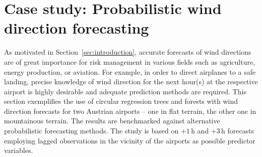 \documentclass[nojss,shortnames]{jss}
\numberwithin{equation}{section}
\begin{document}
\section{Case study: Probabilistic wind direction forecasting}
\label{sec:wind}
As motivated in Section~\ref{sec:introduction}, accurate forecasts of wind
directions are of great importance for risk management in various fields such
as agriculture, energy production, or aviation. For example, in order to direct
airplanes to a safe landing, precise knowledge of wind direction for the next
hour(s) at the respective airport is highly desirable and adequate prediction
methods are required. This section exemplifies the use of circular regression
trees and forests with wind direction forecasts for two Austrian airports --
one in flat terrain, the other one in mountainous terrain. The results are
benchmarked against alternative probabilistic forecasting methods. The study is
based on $+1$\,h and $+3$\,h forecasts employing lagged observations in the
vicinity of the airports as possible predictor variables. 
\end{document}
